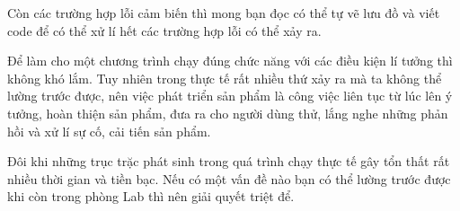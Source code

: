 Còn các trường hợp lỗi cảm biến thì mong bạn đọc có thể tự vẽ lưu đồ và viết code để có thể xử lí hết các trường hợp lỗi có thể xảy ra.

Để làm cho một chương trình chạy đúng chức năng với các điều kiện lí tưởng thì không khó lắm. Tuy nhiên trong thực tế rất nhiều thứ xảy ra mà ta không thể lường trước được, nên việc phát triển sản phẩm là công việc liên tục từ lúc lên ý tưởng, hoàn thiện sản phẩm, đưa ra cho người dùng thử, lắng nghe những phản hồi và xử lí sự cố, cải tiến sản phẩm.

Đôi khi những trục trặc phát sinh trong quá trình chạy thực tế gây tổn thất rất nhiều thời gian và tiền bạc. Nếu có một vấn đề nào bạn có thể lường trước được khi còn trong phòng Lab thì nên giải quyết triệt để.


